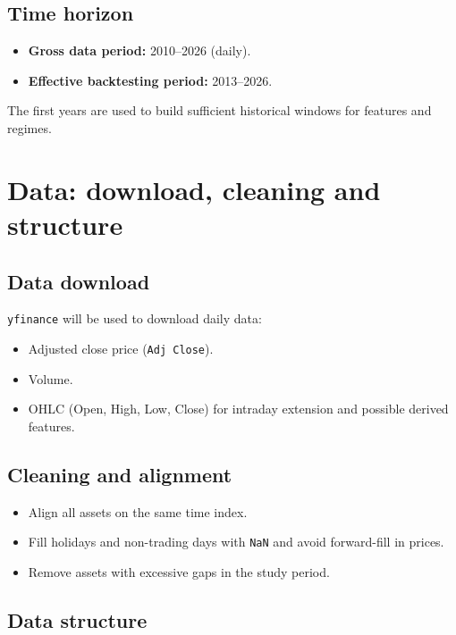 \documentclass[12pt]{article}
\begin{document}
\subsection{Time horizon}

\begin{itemize}
    \item \textbf{Gross data period:} 2010--2026 (daily).
    \item \textbf{Effective backtesting period:} 2013--2026.
\end{itemize}

The first years are used to build sufficient historical windows for features and regimes.

\section{Data: download, cleaning and structure}

\subsection{Data download}

\texttt{yfinance} will be used to download daily data:

\begin{itemize}
    \item Adjusted close price (\texttt{Adj Close}).
    \item Volume.
    \item OHLC (Open, High, Low, Close) for intraday extension and possible derived features.
\end{itemize}

\subsection{Cleaning and alignment}

\begin{itemize}
    \item Align all assets on the same time index.
    \item Fill holidays and non-trading days with \texttt{NaN} and avoid forward-fill in prices.
    \item Remove assets with excessive gaps in the study period.
\end{itemize}

\subsection{Data structure}
\end{document}
